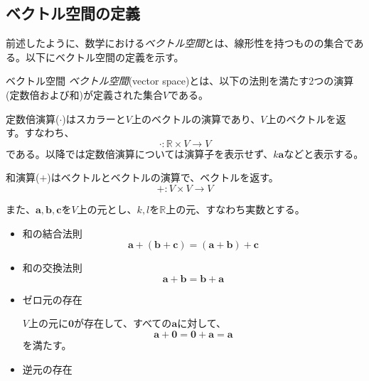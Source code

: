 \subsection{ベクトル空間の定義}
前述したように、数学における\emph{ベクトル空間}とは、線形性を持つものの集合である。以下にベクトル空間の定義を示す。
\begin{definition*}{ベクトル空間}
	\emph{ベクトル空間}(vector space)とは、以下の法則を満たす2つの演算(定数倍および和)が定義された集合\(V\)である。

	定数倍演算(\(\cdot\))はスカラーと\(V\)上のベクトルの演算であり、\(V\)上のベクトルを返す。すなわち、
	\begin{equation}
		\cdot : \mathbb{R}\times V \rightarrow V
	\end{equation}
	である。以降では定数倍演算については演算子を表示せず、\(k\boldsymbol{a}\)などと表示する。

	和演算(\(+\))はベクトルとベクトルの演算で、ベクトルを返す。
	\begin{equation}
		+ : V \times V \rightarrow V
	\end{equation}

	また、\(\boldsymbol{a},\boldsymbol{b},\boldsymbol{c}\)を\(V\)上の元とし、\(k,l\)を\(\mathbb{R}\)上の元、すなわち実数とする。

	\begin{itemize}
		\item 和の結合法則
		      \begin{equation}
			      \boldsymbol{a}+(\boldsymbol{b}+\boldsymbol{c})=
			      (\boldsymbol{a}+\boldsymbol{b})+\boldsymbol{c}
		      \end{equation}

		\item 和の交換法則
		      \begin{equation}
			      \boldsymbol{a}+\boldsymbol{b}=
			      \boldsymbol{b}+\boldsymbol{a}
		      \end{equation}

		\item ゼロ元の存在

		      \(V\)上の元に\(\boldsymbol{0}\)が存在して、すべての\(\boldsymbol{a}\)に対して、
		      \begin{equation}
			      \boldsymbol{a}+\boldsymbol{0}=
			      \boldsymbol{0}+\boldsymbol{a}=\boldsymbol{a}
		      \end{equation}
		      を満たす。

		\item 逆元の存在


\end{itemize}
\end{definition*}
